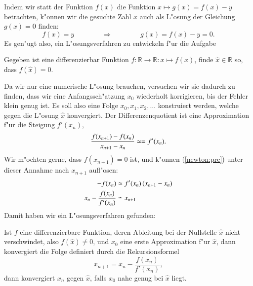 Indem wir statt der Funktion $f(x)$ die Funktion $x\mapsto g(x)=f(x)-y$
betrachten, k"onnen wir die gesuchte Zahl $x$ auch als L"osung der
Gleichung $g(x)=0$ finden:
\begin{equation}
f(x)=y
\qquad\qquad
\Rightarrow
\qquad\qquad
g(x)=f(x)-y = 0.
\label{newton:reduktion}
\end{equation}
Es gen"ugt also, ein L"osungsverfahren zu entwickeln f"ur die Aufgabe
\begin{aufgabe}
Gegeben ist eine differenzierbar Funktion
$f\colon\mathbb R\to\mathbb R:x\mapsto f(x)$,
finde $\hat{x}\in\mathbb R$ so, dass $f(\hat{x})=0$.
\end{aufgabe}
Da wir nur eine numerische L"osung brauchen, versuchen wir sie dadurch
zu finden, dass wir eine Anfangssch"atzung $x_0$ wiederholt korrigieren,
bis der Fehler klein genug ist.
Es soll also eine Folge $x_0,x_1,x_2,\dots$ konstruiert werden, welche
gegen die L"osung $\hat{x}$ konvergiert.
Der Differenzenquotient ist eine Approximation f"ur die Steigung
$f'(x_n)$,
\begin{equation}
\frac{
f(x_{\mathstrut n+1})-f(x_{\mathstrut n})
}{
x_{\mathstrut n+1}-x_{\mathstrut n}
}
\simeq = f'(x_n).
\label{newton:pre}
\end{equation}
Wir m"ochten gerne, dass $f(x_{n+1})=0$ ist, und k"onnen (\ref{newton:pre})
unter dieser Annahme nach $x_{n+1}$ aufl"osen:
\begin{align*}
-f(x_n)
&\simeq
f'(x_n)\,(x_{\mathstrut n+1}-x_{\mathstrut n})
\\
x_{\mathstrut n}-\frac{f(x_n)}{f'(x_n)}
&\simeq x_{\mathstrut n+1}
\end{align*}
Damit haben wir ein L"osungsverfahren gefunden:
\begin{satz}[Newton]
\label{newton:satz}
Ist $f$ eine differenzierbare Funktion, deren Ableitung bei der Nullstelle
$\hat{x}$ nicht verschwindet, also $f(\hat{x})\ne 0$, und $x_0$ eine erste
Approximation f"ur $\hat{x}$, dann konvergiert die Folge
definiert durch die Rekursionsformel
\[
x_{n+1}=x_n-\frac{f(x_n)}{f'(x_n)},
\]
dann konvergiert $x_n$ gegen $\hat{x}$, falls $x_0$ nahe genug bei
$\hat{x}$ liegt.
\end{satz}

